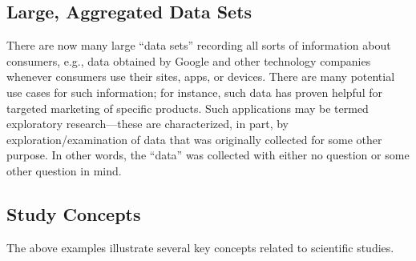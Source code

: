 \documentclass[
]{book}
\begin{document}
\hypertarget{large-aggregated-data-sets}{%
\subsection{Large, Aggregated Data Sets}\label{large-aggregated-data-sets}}

There are now many large ``data sets'' recording all sorts of information about consumers, e.g., data obtained by Google and other technology companies whenever consumers use their sites, apps, or devices. There are many potential use cases for such information; for instance, such data has proven helpful for targeted marketing of specific products. Such applications may be termed exploratory research---these are characterized, in part, by exploration/examination of data that was originally collected for some other purpose. In other words, the ``data'' was collected with either no question or some other question in mind.

\hypertarget{study-concepts}{%
\subsection{Study Concepts}\label{study-concepts}}

The above examples illustrate several key concepts related to scientific studies.
\end{document}
